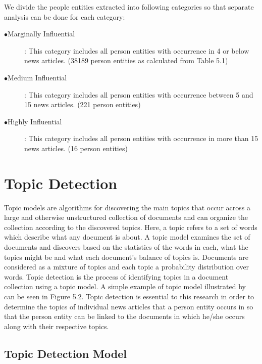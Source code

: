 We divide the people entities extracted into following categories so that separate analysis can be done for each category:
\begin{description}
 \item[$\bullet$Marginally Influential]: This category includes all person entities with occurrence in 4 or below news articles. (38189 person entities as calculated from Table 5.1)
\item[$\bullet$Medium Influential]: This category includes all person entities with occurrence between 5 and 15 news articles. (221 person entities) 
\item[$\bullet$Highly Influential] : This category includes all person entities with occurrence in more than 15 news articles. (16 person entities)
\end{description}



\section{Topic Detection}
\label{topic detection}

 Topic models are algorithms for discovering the main topics that occur across a large and otherwise 
unstructured collection of documents and can organize the collection according to the discovered topics.
Here, a topic refers to a set of words which describe what any document is about.
 A topic model examines the set of documents and discovers based on the statistics of the words in each, what the topics might be and what each document's balance of topics is.
Documents are considered as a mixture of topics and each topic a probability distribution over words.
 Topic detection is the process of identifying topics in a document collection using a topic model. A simple example of topic model illustrated by \cite{blei2012probabilistic} can be seen in Figure 5.2.
Topic detection is essential to this research in order to determine the topics of individual news articles that a person entity occurs in so that the person entity can be linked to the documents in which he/she occurs along with their respective topics.



\subsection{Topic Detection Model}


